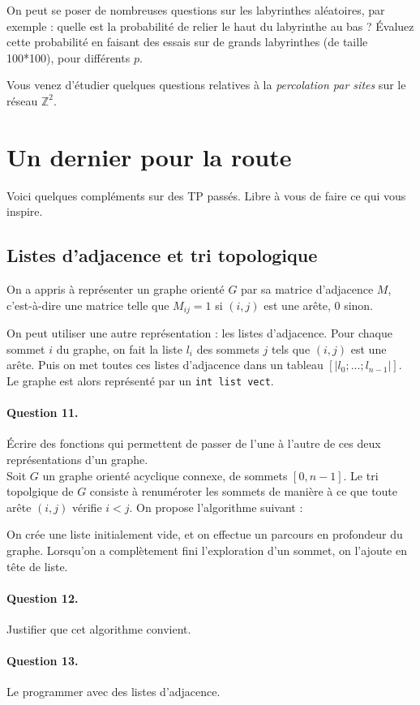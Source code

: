 \documentclass[10pt,a4paper]{article}
\begin{document}
On peut se poser de nombreuses questions sur les labyrinthes aléatoires, par
exemple : quelle est la probabilité de relier le haut du labyrinthe au bas ? Évaluez
cette probabilité en faisant des essais sur de grands labyrinthes (de taille 100*100),
pour différents $p$.

Vous venez d'étudier quelques questions relatives à la \textit{percolation par
sites} sur le réseau $\mathbb{Z}^2$.
\section{Un dernier pour la route}
Voici quelques compléments sur des TP passés. Libre à vous de faire ce qui vous
inspire.
\subsection{Listes d'adjacence et tri topologique}
On a appris à représenter un graphe orienté $G$ par sa matrice d'adjacence $M$,
c'est-à-dire une matrice telle que $M_{ij}=1$ si $(i,j)$ est une arête, $0$ sinon.

On peut utiliser une autre représentation : les listes d'adjacence. Pour chaque sommet
$i$ du graphe, on fait la liste $l_i$ des sommets $j$ tels que $(i,j)$ est une arête.
Puis on met toutes ces listes d'adjacence dans un tableau $[|l_0 ; ... ; l_{n-1}|]$. 
Le graphe est alors représenté par un \texttt{int list vect}.
\paragraph{Question 11.} Écrire des fonctions qui permettent de passer de l'une à
l'autre de ces deux représentations d'un graphe.
\\

Soit $G$ un graphe orienté acyclique connexe, de sommets $[0,n-1]$. Le tri topolgique de
$G$ consiste à renuméroter les sommets de manière à ce que toute arête $(i,j)$
vérifie $i<j$. On propose l'algorithme suivant :

On crée une liste initialement vide, et on effectue un parcours en profondeur du
graphe. Lorsqu'on a complètement fini l'exploration d'un sommet, on l'ajoute en
tête de liste.

\paragraph{Question 12.} Justifier que cet algorithme convient.

\paragraph{Question 13.} Le programmer avec des listes d'adjacence.
\\
\end{document}
